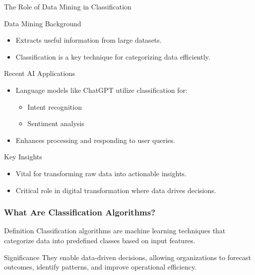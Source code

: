 \documentclass[aspectratio=169]{beamer}
\begin{document}
\begin{frame}[fragile]{The Role of Data Mining in Classification}
  \begin{block}{Data Mining Background}
    \begin{itemize}
      \item Extracts useful information from large datasets.
      \item Classification is a key technique for categorizing data efficiently.
    \end{itemize}
  \end{block}
  
  \begin{block}{Recent AI Applications}
    \begin{itemize}
      \item Language models like ChatGPT utilize classification for:
      \begin{itemize}
        \item Intent recognition
        \item Sentiment analysis
      \end{itemize}
      \item Enhances processing and responding to user queries.
    \end{itemize}
  \end{block}
  
  \begin{block}{Key Insights}
    \begin{itemize}
      \item Vital for transforming raw data into actionable insights.
      \item Critical role in digital transformation where data drives decisions.
    \end{itemize}
  \end{block}
\end{frame}

\begin{frame}[fragile]
    \frametitle{What Are Classification Algorithms?}
    \begin{block}{Definition}
        Classification algorithms are machine learning techniques that categorize data into predefined classes based on input features.
    \end{block}
    \begin{block}{Significance}
        They enable data-driven decisions, allowing organizations to forecast outcomes, identify patterns, and improve operational efficiency.
    \end{block}
\end{frame}
\end{document}
